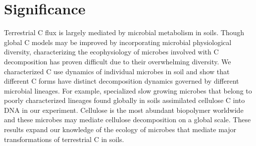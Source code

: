 \section{Significance} Terrestrial C flux is largely mediated by microbial
metabolism in soils. Though global C models may be improved by incorporating
microbial physiological diversity, characterizing the ecophysiology of microbes
involved with C decomposition has proven difficult due to their overwhelming
diversity. We characterized C use dynamics of individual microbes in soil and
show that different C forms have distinct decomposition dynamics governed
by different microbial lineages. For example, specialized slow growing
microbes that belong to poorly characterized lineages found globally in
soils assimilated cellulose C into DNA in our experiment. Cellulose is the
most abundant biopolymer worldwide and these microbes may mediate
cellulose decomposition on a global scale. These results expand our
knowledge of the ecology of microbes that mediate major transformations of
terrestrial C in soils.
